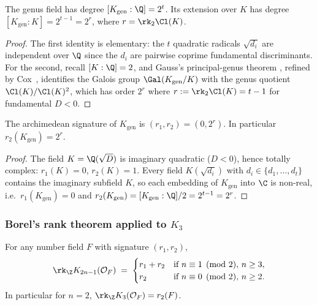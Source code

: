 \begin{lemma}\label{lem:conjF-genus-degree}
The genus field has degree $[K_{\mathrm{gen}}:\Q] = 2^t$.  Its
extension over $K$ has degree $[K_{\mathrm{gen}} : K] = 2^{t-1} = 2^r$,
where $r = \rk_2 \Cl(K)$.
\end{lemma}

\begin{proof}
The first identity is elementary: the $t$ quadratic radicals
$\sqrt{d_i}$ are independent over $\Q$ since the $d_i$ are pairwise
coprime fundamental discriminants.  For the second, recall
$[K:\Q] = 2$, and Gauss's principal-genus theorem
\cite[\S225]{Gauss1801}, refined by Cox~\cite[Thm.~3.15]{Cox1989},
identifies the Galois group $\Gal(K_{\mathrm{gen}}/K)$ with the genus
quotient $\Cl(K)/\Cl(K)^2$, which has order $2^r$ where
$r := \rk_2 \Cl(K) = t - 1$ for fundamental $D < 0$.
\end{proof}

\begin{lemma}\label{lem:conjF-genus-signature}
The archimedean signature of $K_{\mathrm{gen}}$ is
$(r_1, r_2) = (0, 2^r)$.  In particular $r_2(K_{\mathrm{gen}}) = 2^r$.
\end{lemma}

\begin{proof}
The field $K = \Q(\sqrt D)$ is imaginary quadratic ($D < 0$), hence
totally complex: $r_1(K) = 0$, $r_2(K) = 1$.  Every field
$K(\sqrt{d_i})$ with $d_i \in \{d_1, \ldots, d_t\}$ contains the
imaginary subfield $K$, so each embedding of $K_{\mathrm{gen}}$ into
$\C$ is non-real, i.e.\ $r_1(K_{\mathrm{gen}}) = 0$ and
$r_2(K_{\mathrm{gen}}) = [K_{\mathrm{gen}}:\Q]/2 = 2^{t-1} = 2^r$.
\end{proof}

\subsubsection{Borel's rank theorem applied to \texorpdfstring{$K_3$}{K3}}
\label{sec:conjF-borel-rank}

\begin{theorem}\label{thm:conjF-borel-K3}
For any number field $F$ with signature $(r_1, r_2)$,
\[
   \rk_\Z K_{2n-1}(\mathcal{O}_F) \;=\;
   \begin{cases}
   r_1 + r_2 & \text{if } n \equiv 1 \pmod 2,\, n \ge 3,\\
   r_2 & \text{if } n \equiv 0 \pmod 2,\, n \ge 2.
   \end{cases}
\]
In particular for $n = 2$,
$\rk_\Z K_3(\mathcal{O}_F) = r_2(F)$.
\end{theorem}

